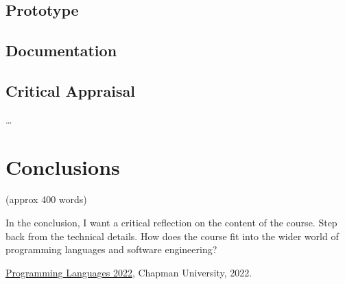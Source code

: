 \documentclass{article}
\theoremstyle{theorem}
\theoremstyle{definition}
\theoremstyle{remark}
\begin{document}
\subsection{Prototype}
\subsection{Documentation}
\subsection{Critical Appraisal}

\ldots

\section{Conclusions}\label{conclusions}

(approx 400 words)

In the conclusion, I want a critical reflection on the content of the course. Step back from the technical details. How does the course fit into the wider world of programming languages and software engineering?

\begin{thebibliography}{99}
 \href{https://github.com/alexhkurz/programming-languages-2022/blob/main/README.md}{Programming Languages 2022}, Chapman University, 2022.
\end{thebibliography}
\end{document}
